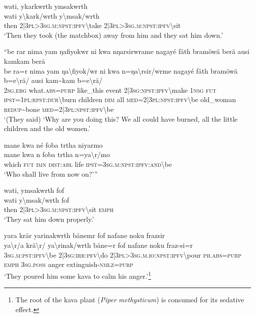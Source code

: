 \ea\label{ex:11:a2564}
wati, ykarkwrth ymsakwrth\\
\gll wati	y{\textbackslash}kark/wrth	y{\textbackslash}msak/wrth\\
     then	2|3\textsc{pl}>3\textsc{sg}.\textsc{m}:\textsc{npst}:\textsc{ipfv}{\textbackslash}take	2|3\textsc{pl}>3\textsc{sg}.\textsc{m}:\textsc{npst}:\textsc{ipfv}{\textbackslash}sit\\
\glt `Then they took (the matchbox) away from him and they sat him down.'
\z

\ea\label{ex:11:a2565}
``be rar nima yam ŋafiyokwr ni kwa nŋarsirwrame nagayé fäth bramöwä berä ausi kamkam berä\\
\gll be	ra=r	nima	yam	ŋa{\textbackslash}fiyok/wr	ni	kwa	n=ŋa{\textbackslash}rsir/wrme	nagayé	fäth	bramöwä	b=e{\textbackslash}rä/	ausi	kam{\textasciitilde}kam	b=e{\textbackslash}rä/\\
     2\textsc{sg}.\textsc{erg}	what.\textsc{abs}=\textsc{purp}	like\_this	event	2|3\textsc{sg}:\textsc{npst}:\textsc{ipfv}{\textbackslash}make	1\textsc{nsg}	\textsc{fut}	\textsc{ipst}=1\textsc{pl}:\textsc{rpst}:\textsc{dur}{\textbackslash}burn	children	\textsc{dim}	all	\textsc{med}=2|3\textsc{pl}:\textsc{npst}:\textsc{ipfv}{\textbackslash}be	old\_woman	\textsc{redup}{\textasciitilde}bone	\textsc{med}=2|3\textsc{pl}:\textsc{npst}:\textsc{ipfv}{\textbackslash}be\\
\glt `(They said) ‘Why are you doing this? We all could have burned, all the little children and the old women.'
\z

\ea\label{ex:11:a2566}
mane kwa né foba trtha niyarmo\\
\gll mane	kwa	n	foba	trtha	n=ya{\textbackslash}r/mo\\
     which	\textsc{fut}	\textsc{imn}	\textsc{dist}:\textsc{abl}	life	\textsc{ipst}=3\textsc{sg}.\textsc{m}:\textsc{npst}:\textsc{ipfv}:\textsc{and}{\textbackslash}be\\
\glt `Who shall live from now on?'''
\z

\ea\label{ex:11:a2567}
wati, ymsakwrth fof\\
\gll wati	y{\textbackslash}msak/wrth	fof\\
     then	2|3\textsc{pl}>3\textsc{sg}.\textsc{m}:\textsc{npst}:\textsc{ipfv}{\textbackslash}sit	\textsc{emph}\\
\glt `They sat him down properly.'
\z

\ea\label{ex:11:a2568}
yara krär yarinakwrth bänemr fof nafane noku frazsir\\
\gll ya{\textbackslash}r/a	krä{\textbackslash}r/	ya{\textbackslash}rinak/wrth	bäne=r	fof	nafane	noku	fraz-si=r\\
     3\textsc{sg}.\textsc{m}:\textsc{pst}:\textsc{ipfv}{\textbackslash}be	2|3\textsc{sg}:\textsc{irr}:\textsc{pfv}{\textbackslash}do	2|3\textsc{pl}>3\textsc{sg}.\textsc{m}.\textsc{io}:\textsc{npst}:\textsc{ipfv}{\textbackslash}pour	\textsc{ph}.\textsc{abs}=\textsc{purp}	\textsc{emph}	3\textsc{sg}.\textsc{poss}	anger	extinguish-\textsc{nmlz}=\textsc{purp}\\
\glt `They poured him some kava to calm his anger.'\footnote{The root of the kava plant (\textit{Piper methysticum}) is consumed for its sedative effect.}
\z

